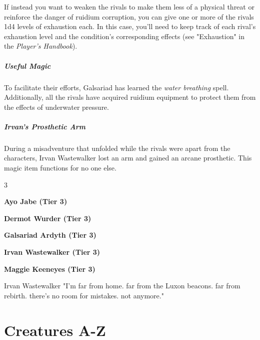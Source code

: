 \documentclass[10pt,a4paper,twoside,bg=print,twocolumn,openany,nodeprecatedcode]{dndbook}
\begin{document}
If instead you want to weaken the rivals to make them less of a physical threat or reinforce the danger of ruidium corruption, you can give one or more of the rivals 1d4 levels of exhaustion each. In this case, you'll need to keep track of each rival's exhaustion level and the condition's corresponding effects (see "Exhaustion" in the \textit{Player's Handbook}).

\subparagraph{Useful Magic}
To facilitate their efforts, Galsariad has learned the \textit{water breathing} spell. Additionally, all the rivals have acquired ruidium equipment to protect them from the effects of underwater pressure.

\subparagraph{Irvan's Prosthetic Arm}
During a misadventure that unfolded while the rivals were apart from the characters, Irvan Wastewalker lost an arm and gained an arcane prosthetic. This magic item functions for no one else.


\begin{itemize}
\begin{multicols}{3}
\item \textbf{Ayo Jabe (Tier 3)}
\item \textbf{Dermot Wurder (Tier 3)}
\item \textbf{Galsariad Ardyth (Tier 3)}
\item \textbf{Irvan Wastewalker (Tier 3)}
\item \textbf{Maggie Keeneyes (Tier 3)}
\end{multicols}

\end{itemize}

\begin{DndReadAloud}{Irvan Wastewalker}
"I'm far from home. far from the Luxon beacons. far from rebirth. there's no room for mistakes. not anymore."

\end{DndReadAloud}

\section{Creatures A-Z}
\end{document}
